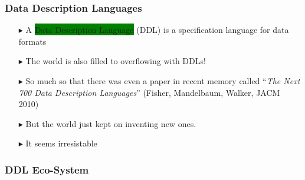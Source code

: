 \documentclass{beamer}
\newcommand{\gemph}[1]{\colorbox{green}{#1}}
\begin{document}
\begin{frame}\frametitle{Data Description Languages}

\begin{itemize}

\item [$\blacktriangleright$] A \gemph{Data Description Language}
  (DDL) is a specification language for data formats

\item [$\blacktriangleright$] The world is also filled to overflowing with DDLs!

\item [$\blacktriangleright$] So much so that there was even a paper in recent memory called
  ``\emph{The Next 700 Data Description Languages}'' (Fisher, Mandelbaum, Walker, JACM 2010)

\item [$\blacktriangleright$] But the world just kept on inventing new ones.

\item [$\blacktriangleright$] It seems irresistable

\end{itemize}

\end{frame}


\begin{frame}\frametitle{DDL Eco-System}


\end{frame}


\end{document}
